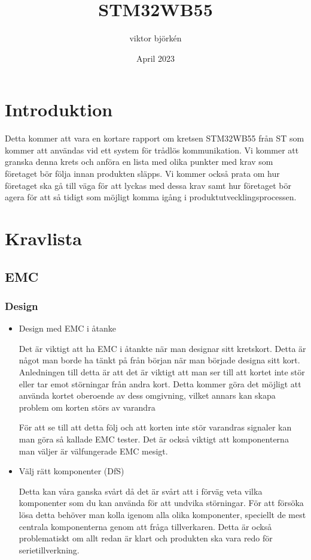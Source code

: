 \documentclass{article}
\title{STM32WB55}
\author{viktor björkén }
\date{April 2023}
\begin{document}
\maketitle

\section{Introduktion}
Detta kommer att vara en kortare rapport om kretsen STM32WB55 från ST som kommer att användas vid ett system för trådlös kommunikation. Vi kommer att granska denna krets och anföra en lista med olika punkter med krav som företaget bör följa innan produkten släpps. Vi kommer också prata om hur företaget ska gå till väga för att lyckas med dessa krav samt hur företaget bör agera för att så tidigt som möjligt komma igång i produktutvecklingsprocessen.

\section{Kravlista}
\subsection{EMC}
\subsubsection{Design}
\begin{itemize}
    \item Design med EMC i åtanke
        
        Det är viktigt att ha EMC i åtankte när man designar sitt kretskort. Detta är något man borde ha tänkt på från början när man började designa sitt kort. Anledningen till detta är att det är viktigt att man ser till att kortet inte stör eller tar emot störningar från andra kort. Detta kommer göra det möjligt att använda kortet oberoende av dess omgivning, vilket annars kan skapa problem om korten störs av varandra \cite{Williams2011-dz}

        För att se till att detta följ och att korten inte stör varandras signaler kan man göra så kallade EMC tester. Det är också viktigt att komponenterna man väljer är välfungerade EMC mesigt.
    
    \item Välj rätt komponenter (DfS)
    
        Detta kan våra ganska svårt då det är svårt att i förväg veta vilka komponenter som du kan använda för att undvika störningar. För att försöka lösa detta behöver man kolla igenom alla olika komponenter, speciellt de mest centrala komponenterna genom att fråga tillverkaren. Detta är också problematiskt om allt redan är klart och produkten ska vara redo för serietillverkning.   

\end{itemize}
\end{document}
